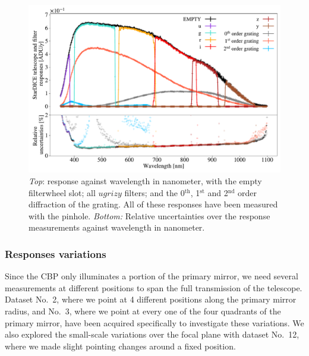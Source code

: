 \begin{figure}%
    \centering
    \includegraphics[width=\columnwidth]{fig/stardice_75um_response.pdf}
    \caption{\textit{Top}: \SD response against wavelength in nanometer, with the empty filterwheel slot; all $ugrizy$ filters; and the 0$^\mathrm{th}$, 1$^\mathrm{st}$ and 2$^\mathrm{nd}$ order diffraction of the grating. All of these responses have been measured with the \spinhole pinhole. \textit{Bottom:} Relative uncertainties over the \SD response measurements against wavelength in nanometer.}
    \label{fig:stardice_75um_response}
\end{figure}


\subsubsection{\SD Responses variations}

Since the CBP only illuminates a portion of the primary mirror, we need several measurements at different positions to span the full transmission of the \SD telescope. Dataset No.~2, where we point at 4 different positions along the primary mirror radius, and No.~3, where we point at every one of the four quadrants of the primary mirror, have been acquired specifically to investigate these variations. We also explored the small-scale variations over the focal plane with dataset No.~12, where we made slight pointing changes around a fixed position.


